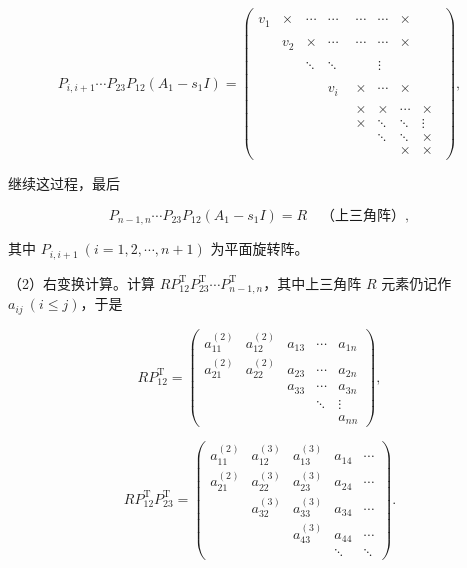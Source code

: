 \documentclass[
  10pt,
  fontset=fandol]{ctexart}
\begin{document}
\[
P_{i,i+1}\cdots P_{23}P_{12}(A_1-s_1I)
=\begin{pmatrix}
v_1&\times&\cdots&\cdots&\begin{matrix}\cdots&\cdots&\times\end{matrix}\\
&v_2&\times&\cdots&\begin{matrix}\cdots&\cdots&\times\end{matrix}\\
&&\ddots&\ddots&\begin{matrix}&&\vdots\end{matrix}\\
&&&v_i&\begin{matrix}\times&\cdots&\times\end{matrix}\\
&&&&\boxed{\begin{matrix}
\times&\times&\cdots&\times\\
\times&\ddots&\ddots&\vdots\\
&\ddots&\ddots&\times\\
&&\times&\times
\end{matrix}}
\end{pmatrix},
\]

继续这过程，最后

\[
P_{n-1,n}\cdots P_{23}P_{12}(A_1-s_1I)=R\quad\text{（上三角阵）},
\]

其中 \(P_{i,i+1}\ (i=1,2,\cdots,n+1)\) 为平面旋转阵。

（2）右变换计算。计算 \(RP_{12}^{\mathrm T}P_{23}^{\mathrm T}\cdots P_{n-1,n}^{\mathrm T}\)，其中上三角阵 \(R\) 元素仍记作 \(a_{ij}\ (i\leq j)\)，于是

\[
RP_{12}^{\mathrm T}=\begin{pmatrix}
a_{11}^{(2)}&a_{12}^{(2)}&a_{13}&\cdots&a_{1n}\\
a_{21}^{(2)}&a_{22}^{(2)}&a_{23}&\cdots&a_{2n}\\
&&a_{33}&\cdots&a_{3n}\\
&&&\ddots&\vdots\\
&&&&a_{nn}
\end{pmatrix},
\]

\[
RP_{12}^{\mathrm T}P_{23}^{\mathrm T}=\begin{pmatrix}
a_{11}^{(2)}&a_{12}^{(3)}&a_{13}^{(3)}&a_{14}&\cdots\\
a_{21}^{(2)}&a_{22}^{(3)}&a_{23}^{(3)}&a_{24}&\cdots\\
&a_{32}^{(3)}&a_{33}^{(3)}&a_{34}&\cdots\\
&&a_{43}^{(3)}&a_{44}&\cdots\\
&&&\ddots&\ddots
\end{pmatrix}.
\]
\end{document}
